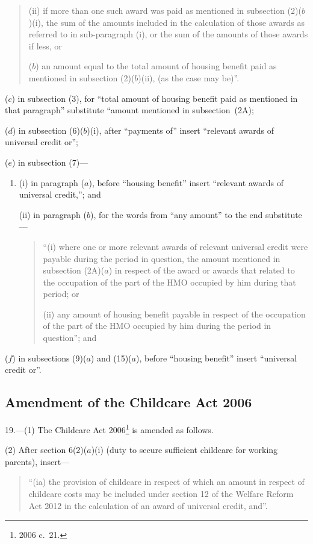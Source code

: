 \documentclass[12pt,a4paper]{article}
\begin{document}
\begin{enumerate}
\begin{quotation}
\begin{enumerate}
\begin{enumerate}
(ii) if more than one such award was paid as mentioned in subsection (2)($b$)(i), the sum of the amounts included in the calculation of those awards as referred to in sub-paragraph (i), or the sum of the amounts of those awards if less, or
\end{enumerate}

($b$) an amount equal to the total amount of housing benefit paid as mentioned in subsection (2)($b$)(ii), (as the case may be)”.
\end{enumerate}
\end{quotation}

($c$) in subsection (3), for “total amount of housing benefit paid as mentioned in that paragraph” substitute “amount mentioned in subsection~(2A);

($d$) in subsection (6)($b$)(i), after “payments of” insert “relevant awards of universal credit or”;

($e$) in subsection (7)—
\begin{enumerate}\item[]
(i) in paragraph ($a$), before “housing benefit” insert “relevant awards of universal credit,”; and

(ii) in paragraph ($b$), for the words from “any amount” to the end substitute—
\begin{quotation}
“(i) where one or more relevant awards of relevant universal credit were payable during the period in question, the amount mentioned in subsection (2A)($a$)  in respect of the award or awards that related to the occupation of the part of the HMO occupied by him during that period; or

(ii) any amount of housing benefit payable in respect of the occupation of the part of the HMO occupied by him during the period in question”; and
\end{quotation}
\end{enumerate}

($f$) in subsections (9)($a$)  and (15)($a$), before “housing benefit” insert “universal credit or”.
\end{enumerate}

\subsection[19. Amendment of the Childcare Act 2006]{Amendment of the Childcare Act 2006}

19.—(1) The Childcare Act 2006\footnote{2006 c.~21.} is amended as follows.

(2) After section 6(2)($a$)(i)  (duty to secure sufficient childcare for working parents), insert—
\begin{quotation}
“(ia) the provision of childcare in respect of which an amount in respect of childcare costs may be included under section 12 of the Welfare Reform Act 2012 in the calculation of an award of universal credit, and”.
\end{quotation}
\end{document}
